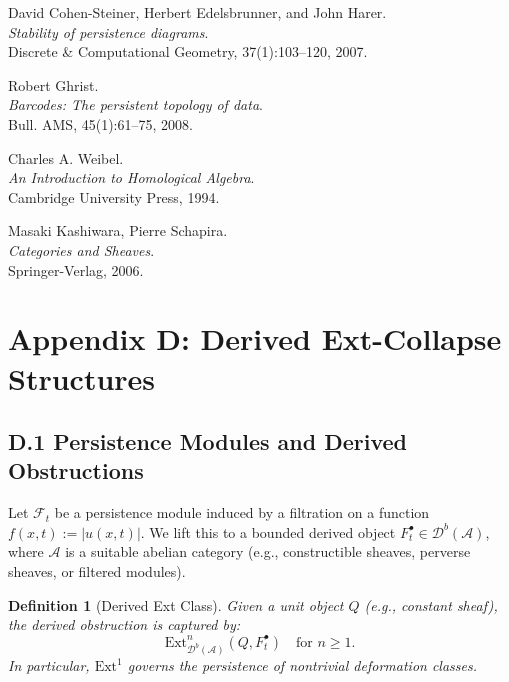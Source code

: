 \documentclass[11pt]{article}
\newtheorem{definition}[theorem]{Definition}
\begin{document}
\begin{thebibliography}{9}

David Cohen-Steiner, Herbert Edelsbrunner, and John Harer.\\
\textit{Stability of persistence diagrams}.\\
Discrete \& Computational Geometry, 37(1):103--120, 2007.

Robert Ghrist.\\
\textit{Barcodes: The persistent topology of data}.\\
Bull. AMS, 45(1):61--75, 2008.

Charles A. Weibel.\\
\textit{An Introduction to Homological Algebra}.\\
Cambridge University Press, 1994.

Masaki Kashiwara, Pierre Schapira.\\
\textit{Categories and Sheaves}.\\
Springer-Verlag, 2006.

\end{thebibliography}




\section*{Appendix D: Derived Ext-Collapse Structures}

\subsection*{D.1 Persistence Modules and Derived Obstructions}

Let $\mathcal{F}_t$ be a persistence module induced by a filtration on a function $f(x,t) := |u(x,t)|$.  
We lift this to a bounded derived object $F_t^\bullet \in \mathcal{D}^b(\mathcal{A})$, where $\mathcal{A}$ is a suitable abelian category (e.g., constructible sheaves, perverse sheaves, or filtered modules).

\begin{definition}[Derived Ext Class]
Given a unit object $Q$ (e.g., constant sheaf), the derived obstruction is captured by:
\[
\mathrm{Ext}^n_{\mathcal{D}^b(\mathcal{A})}(Q, F^\bullet_t) \quad \text{for } n \geq 1.
\]
In particular, $\mathrm{Ext}^1$ governs the persistence of nontrivial deformation classes.
\end{definition}
\end{document}

